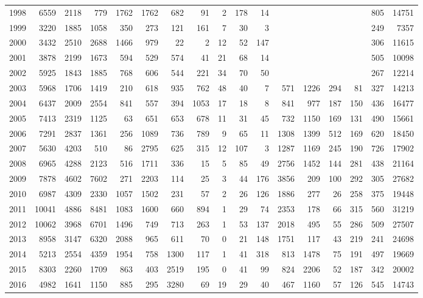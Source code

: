 \documentclass[]{article}
\begin{document}
\begin{table}[ht]
{\begin{tabular}{rrrrrrrrrrrrrrrrr}
  1998 & 6559 & 2118 & 779 & 1762 & 1762 & 682 & 91 & 2 & 178 & 14 &  &  &  &  & 805 & 14751 \\ 
  1999 & 3220 & 1885 & 1058 & 350 & 273 & 121 & 161 & 7 & 30 & 3 &  &  &  &  & 249 & 7357 \\ 
  2000 & 3432 & 2510 & 2688 & 1466 & 979 & 22 & 2 & 12 & 52 & 147 &  &  &  &  & 306 & 11615 \\ 
  2001 & 3878 & 2199 & 1673 & 594 & 529 & 574 & 41 & 21 & 68 & 14 &  &  &  &  & 505 & 10098 \\ 
  2002 & 5925 & 1843 & 1885 & 768 & 606 & 544 & 221 & 34 & 70 & 50 &  &  &  &  & 267 & 12214 \\ 
  2003 & 5968 & 1706 & 1419 & 210 & 618 & 935 & 762 & 48 & 40 & 7 & 571 & 1226 & 294 & 81 & 327 & 14213 \\ 
  2004 & 6437 & 2009 & 2554 & 841 & 557 & 394 & 1053 & 17 & 18 & 8 & 841 & 977 & 187 & 150 & 436 & 16477 \\ 
  2005 & 7413 & 2319 & 1125 & 63 & 651 & 653 & 678 & 11 & 31 & 45 & 732 & 1150 & 169 & 131 & 490 & 15661 \\ 
  2006 & 7291 & 2837 & 1361 & 256 & 1089 & 736 & 789 & 9 & 65 & 11 & 1308 & 1399 & 512 & 169 & 620 & 18450 \\ 
  2007 & 5630 & 4203 & 510 & 86 & 2795 & 625 & 315 & 12 & 107 & 3 & 1287 & 1169 & 245 & 190 & 726 & 17902 \\ 
  2008 & 6965 & 4288 & 2123 & 516 & 1711 & 336 & 15 & 5 & 85 & 49 & 2756 & 1452 & 144 & 281 & 438 & 21164 \\ 
  2009 & 7878 & 4602 & 7602 & 271 & 2203 & 114 & 25 & 3 & 44 & 176 & 3856 & 209 & 100 & 292 & 305 & 27682 \\ 
  2010 & 6987 & 4309 & 2330 & 1057 & 1502 & 231 & 57 & 2 & 26 & 126 & 1886 & 277 & 26 & 258 & 375 & 19448 \\ 
  2011 & 10041 & 4886 & 8481 & 1083 & 1600 & 660 & 894 & 1 & 29 & 74 & 2353 & 178 & 66 & 315 & 560 & 31219 \\ 
  2012 & 10062 & 3968 & 6701 & 1496 & 749 & 713 & 263 & 1 & 53 & 137 & 2018 & 495 & 55 & 286 & 509 & 27507 \\ 
  2013 & 8958 & 3147 & 6320 & 2088 & 965 & 611 & 70 & 0 & 21 & 148 & 1751 & 117 & 43 & 219 & 241 & 24698 \\ 
  2014 & 5213 & 2554 & 4359 & 1954 & 758 & 1300 & 117 & 1 & 41 & 318 & 813 & 1478 & 75 & 191 & 497 & 19669 \\ 
  2015 & 8303 & 2260 & 1709 & 863 & 403 & 2519 & 195 & 0 & 41 & 99 & 824 & 2206 & 52 & 187 & 342 & 20002 \\ 
  2016 & 4982 & 1641 & 1150 & 885 & 295 & 3280 & 69 & 19 & 29 & 40 & 467 & 1160 & 57 & 126 & 545 & 14743 \\ 
   \hline
\end{tabular}
}
\end{table}
\end{document}

